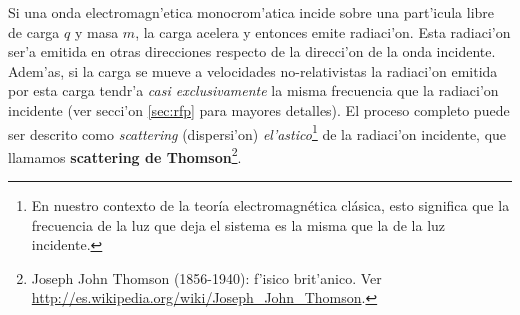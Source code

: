 
Si una onda electromagn'etica monocrom'atica incide
sobre una part'icula libre de carga $q$ y masa $m$, la carga acelera y
entonces emite radiaci'on. Esta radiaci'on ser'a emitida en otras
direcciones respecto de la direcci'on de la onda incidente. Adem'as, si la carga se mueve a velocidades no-relativistas la radiaci'on emitida por esta carga tendr'a \textit{casi exclusivamente} la misma frecuencia que la radiaci'on incidente (ver secci'on \ref{sec:rfp} para mayores detalles). El proceso completo puede ser descrito como \textit{scattering} (dispersi'on) \textit{el'astico}\footnote{En nuestro contexto de la teoría electromagnética clásica, esto significa que la frecuencia de la luz que deja el sistema es la misma que la de la luz incidente.} de la radiaci'on incidente, que llamamos \textbf{scattering de Thomson}\footnote{Joseph John Thomson (1856-1940): f'isico brit'anico. Ver \url{http://es.wikipedia.org/wiki/Joseph_John_Thomson}.}.

